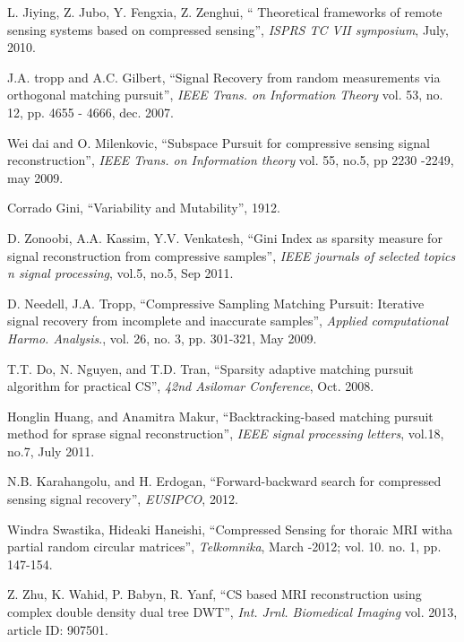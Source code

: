 \documentclass[11pt,conference]{IEEEtran}
\begin{document}
\begin{thebibliography}{60}
 L. Jiying, Z. Jubo, Y. Fengxia, Z. Zenghui, `` Theoretical frameworks of remote sensing systems based on compressed sensing'', \emph{ISPRS TC VII symposium}, July, 2010.

 J.A. tropp and A.C. Gilbert, ``Signal Recovery from random measurements via orthogonal matching pursuit'', \emph{IEEE Trans. on Information Theory}
vol. 53, no. 12, pp. 4655 - 4666, dec. 2007.

 Wei dai and O. Milenkovic, ``Subspace Pursuit for compressive sensing signal reconstruction'', \emph{IEEE Trans. on Information theory}
vol. 55, no.5, pp 2230 -2249, may 2009.

 Corrado Gini, ``Variability and Mutability'', 1912.

 D. Zonoobi, A.A. Kassim, Y.V. Venkatesh, ``Gini Index as sparsity measure for signal reconstruction from
compressive samples'', \emph{IEEE journals of selected topics n signal processing}, vol.5, no.5, Sep 2011.


 D. Needell, J.A. Tropp, ``Compressive Sampling Matching Pursuit: Iterative signal recovery from incomplete and inaccurate samples'', \emph{Applied computational Harmo. Analysis}., vol. 26, no. 3, pp. 301-321, May 2009. 

 T.T. Do, N. Nguyen, and T.D. Tran, ``Sparsity adaptive matching pursuit algorithm for practical CS'', 
\emph{42nd Asilomar Conference}, Oct. 2008.

 Honglin Huang, and Anamitra Makur, ``Backtracking-based matching pursuit method for sprase signal reconstruction'',
\emph{IEEE signal processing letters}, vol.18, no.7, July 2011.

 N.B. Karahangolu, and H. Erdogan, ``Forward-backward search for compressed sensing signal recovery'', \emph{EUSIPCO}, 2012.

 Windra Swastika, Hideaki Haneishi, ``Compressed Sensing for thoraic MRI witha partial random circular matrices'', \emph{Telkomnika}, March -2012; vol. 10. no. 1, pp. 147-154.

 Z. Zhu, K. Wahid, P. Babyn, R. Yanf, ``CS based MRI reconstruction using complex double density dual tree DWT'', \emph{Int. Jrnl. Biomedical Imaging } vol. 2013, article ID: 907501.
 

\end{thebibliography}
\end{document}
